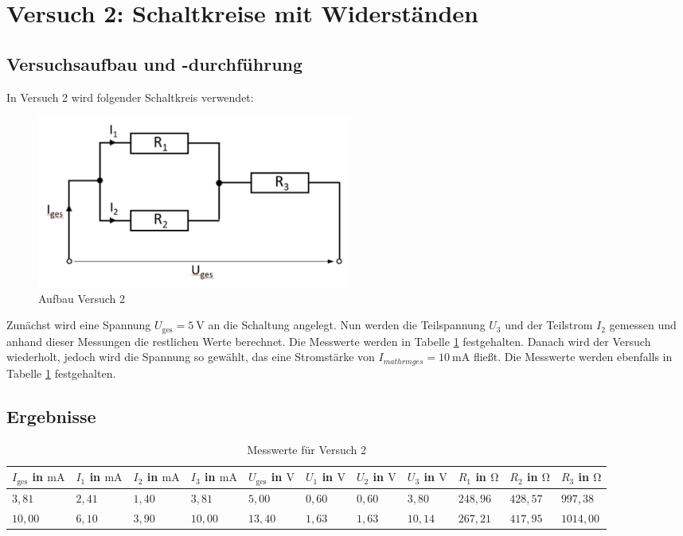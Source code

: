 \section{Versuch 2: Schaltkreise mit Widerständen}

    \subsection{Versuchsaufbau und -durchführung}

        In Versuch 2 wird folgender Schaltkreis verwendet:

        \begin{figure}[H]
            \centering
            \includegraphics[width=0.5\textwidth]{bilder/Physik_04.png}
            \caption{Aufbau Versuch 2}
            \label{fig:versuch2}
        \end{figure}
           
        Zunächst wird eine Spannung $U_{\mathrm{ges}} = 5\ \mathrm{V}$ an die Schaltung angelegt. Nun werden die Teilspannung $U_{3}$ und der Teilstrom $I_{2}$ gemessen und anhand dieser Messungen die restlichen Werte berechnet. Die Messwerte werden in Tabelle \ref{tab:versuch2} festgehalten.
        Danach wird der Versuch wiederholt, jedoch wird die Spannung so gewählt, das eine Stromstärke von $I_{mathrm{ges}} = 10\ \mathrm{mA}$ fließt. Die Messwerte werden ebenfalls in Tabelle \ref{tab:versuch2} festgehalten.

    \subsection{Ergebnisse}

        \begin{table}[H]
            \centering
            \begin{tabular}{|l|l|l|l|l|l|l|l|l|l|l|}
                \hline
                $I_{\mathrm{ges}}$ in $\mathrm{mA}$ & $I_{1}$ in $\mathrm{mA}$ & $I_{2}$ in $\mathrm{mA}$ & $I_{3}$ in $\mathrm{mA}$ & $U_{\mathrm{ges}}$ in $\mathrm{V}$ & $U_{1}$ in $\mathrm{V}$ & $U_{2}$ in $\mathrm{V}$ & $U_{3}$ in $\mathrm{V}$ & $R_{1}$ in $\mathrm{\Omega}$ & $R_{2}$ in $\mathrm{\Omega}$ & $R_{3}$ in $\mathrm{\Omega}$\\
                \hline\hline
                $3,81$ & $2,41$ & $1,40$ & $3,81$ & $5,00$ & $0,60$ & $0,60$ & $3,80$ & $248,96$ & $428,57$ & $997,38$\\
                \hline
                $10,00$ & $6,10$ & $3,90$ & $10,00$ & $13,40$ & $1,63$ & $1,63$ & $10,14$ & $267,21$ & $417,95$ & $1014,00$\\
                \hline
            \end{tabular}
            \caption{Messwerte für Versuch 2}
            \label{tab:versuch2}
        \end{table}

